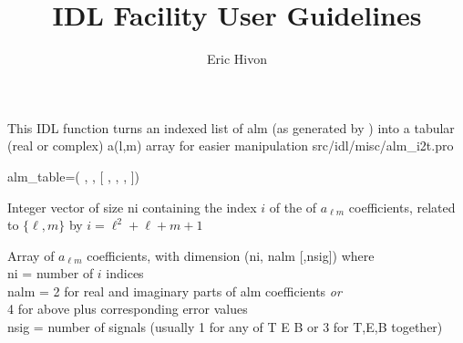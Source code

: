 

\sloppy

\title{\healpix IDL Facility User Guidelines}
 \section[alm\_i2t]{ }
\label{idl:alm_i2t}
\author{Eric Hivon}

\begin{facility}
{This IDL function turns an indexed list of alm (as generated by
) into a tabular (real or complex) a(l,m) array for easier manipulation%
}
{src/idl/misc/alm\_i2t.pro}
\end{facility}

\begin{IDLformat}
{%
{alm\_table}=\thedocid(%
, 
,
[%
,
,
,
%
])}
\end{IDLformat}

\begin{qualifiers}
  \begin{qulist}{} %
    \item[Index] 
Integer vector of size ni containing the index $i$ of the 
            of $a_{\ell m}$ coefficients, related to $\{\ell,m\}$ by 
             $i = \ell^2 + \ell + m + 1$
    \item[Alm\_vec] %
Array of $a_{\ell m}$ coefficients, with dimension (ni, nalm [,nsig])
     where\\
           ni   = number of $i$ indices\\
           nalm = 2 for real and imaginary parts of alm coefficients {\em or}\\
                  4 for above plus corresponding error values\\
           nsig = number of signals (usually 1 for any of T E B
                  or 3 for T,E,B together)
\end{qulist}
\end{qualifiers}

